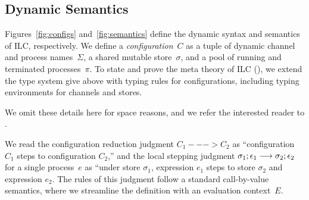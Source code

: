 \begin{comment}
The fork rule says that that if we can appropriately split the affine context
such that the child process $e_1$ has type $A$ and mode $m_1$ and the
``continue'' process $e_2$ has type $B$ and mode $m_2$, then the whole
expression has type $B$ and mode $m_3$, which is derived by composing $m_1$ and
$m_2$ in parallel. Again, we emphasize that composing two write mode processes
in parallel violates type checking, i.e., $\Wm ;; \Wm => p$ cannot be derived
for any mode $p$.

Finally, the choice rule says that if we can appropriately split the affine
context such that both subexpressions $A$ and mode $R$, then the whole
expression follows exactly.

\paragraph{Affine rules.} The affine typing rules are, for the most part, analagous to their
intuitionistic counterparts. Two differences bear mentioning. First, the bang!
rule only lifts intuitionistically typed expressions that are closed with
respect to affine variables into an affinely typed expression. Otherwise, one
could wrap an intuitionistically typed expression with free affine variables in
a bang! and use it in an unrestricted manner. Second, in contrast with the abs
rule, the lollipop rule does not require function bodies to be free with respect
to affine variables.
\end{comment}

\subsection{Dynamic Semantics}
\label{subsec:semantics}

Figures~\ref{fig:configs} and~\ref{fig:semantics} define the dynamic syntax and semantics of ILC, respectively.
%
We define a \emph{configuration}~$C$ as a tuple of dynamic channel and process names~$\Sigma$, 
a shared mutable store~$\sigma$, 
and a pool of running and terminated processes~$\pi$.
%
To state and prove the meta theory of ILC (), we
extend the type system give above with typing rules for
configurations, including typing environments for channels and stores. 

We omit these details here for space reasons, and we refer the interested reader to .

We read the configuration reduction judgment $C_1 ---> C_2$ as ``configuration
$C_1$ steps to configuration $C_2$,'' 
%
and the local stepping judgment $\sigma_1; \epsilon_1 \longrightarrow \sigma_2; \epsilon_2$ for a single process~$e$ as ``under store
$\sigma_1$, expression $e_1$ steps to store $\sigma_{2}$ and expression $e_2$.
%
The rules of this judgment follow a standard call-by-value semantics, 
where we streamline the definition with an evaluation context~$E$.

